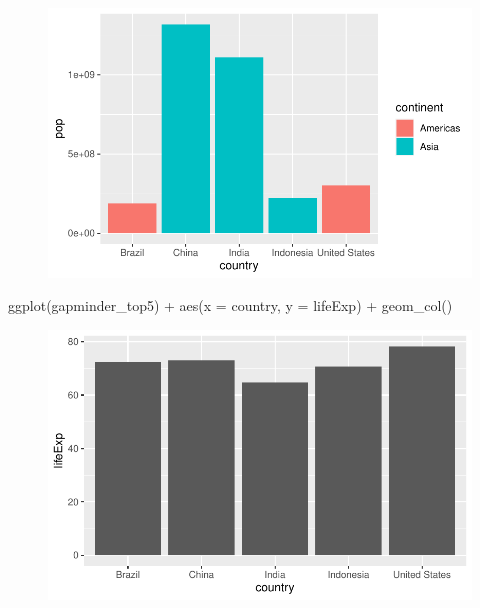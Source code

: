 \documentclass[
  letterpaper,
  DIV=11,
  numbers=noendperiod]{scrartcl}
\newenvironment{Shaded}{\begin{snugshade}}{\end{snugshade}}
\newcommand{\AttributeTok}[1]{\textcolor[rgb]{0.40,0.45,0.13}{#1}}
\newcommand{\FunctionTok}[1]{\textcolor[rgb]{0.28,0.35,0.67}{#1}}
\newcommand{\NormalTok}[1]{\textcolor[rgb]{0.00,0.23,0.31}{#1}}
\newcommand{\SpecialCharTok}[1]{\textcolor[rgb]{0.37,0.37,0.37}{#1}}
\begin{document}
\begin{figure}[H]

{\centering \includegraphics{class05_files/figure-pdf/unnamed-chunk-5-1.pdf}

}

\end{figure}

\begin{Shaded}
\begin{Highlighting}[]
\FunctionTok{ggplot}\NormalTok{(gapminder\_top5) }\SpecialCharTok{+}
  \FunctionTok{aes}\NormalTok{(}\AttributeTok{x =}\NormalTok{ country, }\AttributeTok{y =}\NormalTok{ lifeExp) }\SpecialCharTok{+} 
  \FunctionTok{geom\_col}\NormalTok{()}
\end{Highlighting}
\end{Shaded}

\begin{figure}[H]

{\centering \includegraphics{class05_files/figure-pdf/unnamed-chunk-5-2.pdf}

}

\end{figure}
\end{document}

